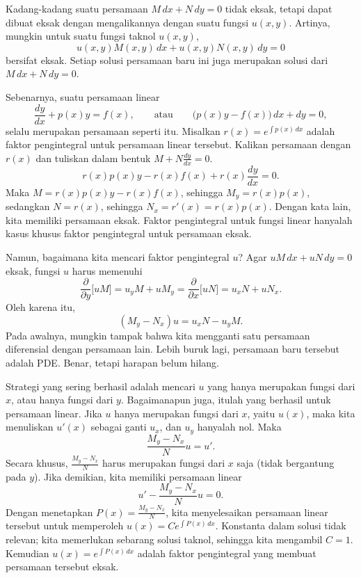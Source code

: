 Kadang-kadang suatu persamaan $M\, dx + N \, dy = 0$ tidak eksak, tetapi dapat
dibuat eksak dengan mengalikannya dengan suatu fungsi $u(x,y)$.  Artinya, mungkin
untuk suatu fungsi taknol $u(x,y)$,
\begin{equation*}
u(x,y) M(x,y) \, dx + u(x,y) N(x,y) \, dy = 0
\end{equation*}
bersifat eksak.  Setiap solusi persamaan baru ini juga merupakan solusi dari
$M\, dx + N \, dy = 0$.

Sebenarnya, suatu persamaan linear
\begin{equation*}
\frac{dy}{dx} + p(x) y = f(x), \qquad
\text{atau} \qquad
\bigl( p(x) y - f(x) \bigr)\, dx + dy  = 0,
\end{equation*}
selalu merupakan persamaan seperti itu.  Misalkan $r(x) = e^{\int p(x)\,dx}$ adalah
faktor pengintegral untuk persamaan linear tersebut.  Kalikan persamaan dengan $r(x)$
dan tuliskan dalam bentuk $M + N \frac{dy}{dx} = 0$.
\begin{equation*}
r(x) p(x) y - r(x) f(x) + r(x) \frac{dy}{dx} = 0 .
\end{equation*}
Maka $M = r(x) p(x) y - r(x) f(x)$, sehingga
$M_y = r(x) p(x)$, sedangkan $N = r(x)$, sehingga
$N_x = r'(x) = r(x) p(x)$.  Dengan kata lain, kita memiliki persamaan eksak.
Faktor pengintegral
untuk fungsi linear hanyalah kasus khusus faktor pengintegral
untuk persamaan eksak.

Namun, bagaimana kita mencari faktor pengintegral $u$?  Agar
$uM \, dx + uN \, dy = 0$ eksak,
fungsi $u$ harus memenuhi
\begin{equation*}
\frac{\partial}{\partial y} \bigl[ u M \bigr] =
u_y M + u M_y =
\frac{\partial}{\partial x} \bigl[ u N \bigr] =
u_x N + u N_x .
\end{equation*}
Oleh karena itu,
\begin{equation*}
(M_y-N_x)u = u_x N - u_y M .
\end{equation*}
Pada awalnya, mungkin tampak bahwa kita mengganti satu persamaan diferensial dengan persamaan lain.
Lebih buruk lagi, persamaan baru tersebut adalah PDE\@.
Benar, tetapi harapan belum hilang.

Strategi yang sering berhasil adalah mencari $u$ yang hanya merupakan fungsi
dari $x$, atau hanya fungsi dari $y$.
Bagaimanapun juga, itulah yang berhasil untuk persamaan linear.
Jika $u$ hanya merupakan fungsi dari $x$,
yaitu $u(x)$, maka kita menuliskan $u'(x)$ sebagai ganti $u_x$, dan $u_y$ hanyalah
nol.
Maka
\begin{equation*}
\frac{M_y-N_x}{N}u = u' .
\end{equation*}
Secara khusus, $\frac{M_y-N_x}{N}$ harus merupakan fungsi dari $x$ saja (tidak
bergantung pada $y$).  Jika demikian, kita memiliki persamaan linear
\begin{equation*}
u' - \frac{M_y-N_x}{N} u = 0 .
\end{equation*}
Dengan menetapkan $P(x) = \frac{M_y-N_x}{N}$,
kita menyelesaikan persamaan linear tersebut
untuk memperoleh $u(x) = C e^{\int P(x) \, dx}$.  Konstanta dalam
solusi tidak relevan; kita memerlukan sebarang solusi taknol,
sehingga kita mengambil $C=1$.
Kemudian $u(x) = e^{\int P(x) \, dx}$ adalah faktor pengintegral
yang membuat persamaan tersebut eksak.

